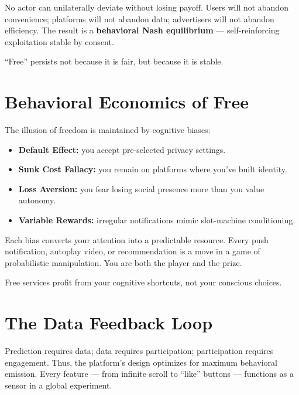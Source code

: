 \documentclass[12pt,twoside]{book}
\begin{document}
No actor can unilaterally deviate without losing payoff.  
Users will not abandon convenience; platforms will not abandon data; advertisers will not abandon efficiency.  
The result is a \textbf{behavioral Nash equilibrium} --- self-reinforcing exploitation stable by consent. \\

\begin{keyidea}
“Free” persists not because it is fair, but because it is stable.
\end{keyidea}

\section{Behavioral Economics of Free}

The illusion of freedom is maintained by cognitive biases:
\begin{itemize}
  \item \textbf{Default Effect:} you accept pre-selected privacy settings.  
  \item \textbf{Sunk Cost Fallacy:} you remain on platforms where you’ve built identity.  
  \item \textbf{Loss Aversion:} you fear losing social presence more than you value autonomy.  
  \item \textbf{Variable Rewards:} irregular notifications mimic slot-machine conditioning.  
\end{itemize}

Each bias converts your attention into a predictable resource.  
Every push notification, autoplay video, or recommendation is a move in a game of probabilistic manipulation.  You are both the player and the prize. \\ 

\begin{keyidea}
Free services profit from your cognitive shortcuts, not your conscious choices.
\end{keyidea}

\section{The Data Feedback Loop}

Prediction requires data; data requires participation; participation requires engagement.  
Thus, the platform’s design optimizes for maximum behavioral emission.  
Every feature --- from infinite scroll to “like” buttons --- functions as a sensor in a global experiment.
\end{document}
